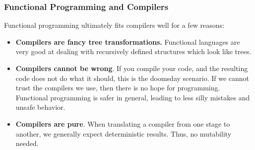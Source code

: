 \documentclass[aspectratio=169]{beamer}
\begin{document}
\begin{frame}[fragile]
  \frametitle{Functional Programming and Compilers}

  Functional programming ultimately fits compilers well for a few reasons:
  \begin{itemize}
    \item \textbf{Compilers are fancy tree transformations.} Functional languages
    are very good at dealing with recursively defined structures which look like
    trees.
    \item \textbf{Compilers cannot be wrong}. If you compile your code, and the
    resulting code does not do what it should, this is the doomsday scenario. If
    we cannot trust the compilers we use, then there is no hope for programming.
    Functional programming is safer in general, leading to less silly mistakes and
    unsafe behavior.
    \item \textbf{Compilers are pure}. When translating a compiler from one
    stage to another, we generally expect deterministic results. Thus, no
    mutability needed.
  \end{itemize}
\end{frame}


\end{document}
